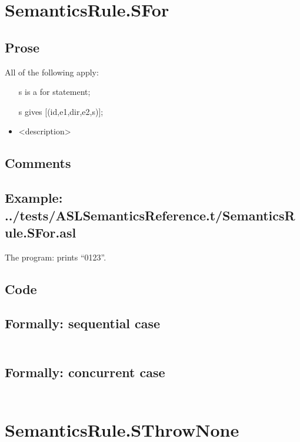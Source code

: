 \documentclass{book}
\begin{document}
\section{SemanticsRule.SFor \label{sec:SemanticsRule.SFor}}

    \subsection{Prose}
    All of the following apply:
    \begin{itemize}
    \item [s] is a for statement;
    \item [s] gives [(id,e1,dir,e2,s)];
    \item <description>
    \end{itemize}

    \subsection{Comments}

    \subsection{Example: ../tests/ASLSemanticsReference.t/SemanticsRule.SFor.asl}
    The program:
    prints ``0123''.

  \subsection{Code}

  \subsection{Formally: sequential case}
  \begin{align}
  \end{align} 

  \subsection{Formally: concurrent case}
  \begin{align}
  \end{align} 

\section{SemanticsRule.SThrowNone \label{sec:SemanticsRule.SThrowNone}}
\end{document}
